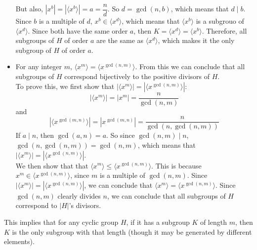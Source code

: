 \documentclass[12pt]{article}
\newcommand{\ang}[1]{\langle #1 \rangle}
\begin{document}
\begin{itemize}[label=$\diamond$]
            But also, $|x^b| = |\ang{x^b}| = a = \dfrac{n}{d}$.
            So $d = \gcd(n, b)$, which means that $d \mid b$.
            Since $b$ is a multiple of $d$, $x^b \in \ang{x^d}$,
            which means that $\ang{x^b}$ is a subgrouo of $\ang{x^d}$.
            Since both have the same order $a$,
            then $K = \ang{x^d} = \ang{x^b}$.
            Therefore, all subgroups of $H$ of order $a$
            are the same as $\ang{x^d}$,
            which makes it the only subgroup of $H$
            of order $a$.
        \item
            For any integer $m$,
            $\ang{x^m} = \ang{x^{\gcd(n, m)}}$.
            From this we can conclude that all subgroups of $H$
            correspond bijectively to the positive divisors of $H$. \\
            To prove this,
            we first show that $|\ang{x^m}| = |\ang{x^{\gcd(n, m)}}|$:
            \[ |\ang{x^m}| = |x^m| = \dfrac{n}{\gcd(n, m)} \]
            and 
            \[ |\ang{x^{\gcd(m, n)}}|
            = |x^{\gcd(m, n)}|
            = \dfrac{n}{\gcd(n, \gcd(n, m))} \]
            If $a \mid n$, then $\gcd(a, n) = a$.
            So since $\gcd(n, m) \mid n$,
            $\gcd(n, \gcd(n, m)) = \gcd(n, m)$,
            which means that $|\ang{x^m}| = |\ang{x^{\gcd(n, m)}}|$. \\
            We then show that 
            that $\ang{x^m} \leqslant \ang{x^{\gcd(n, m)}}$.
            This is because $x^m \in \ang{x^{\gcd(n, m)}}$,
            since $m$ is a multiple of $\gcd(n, m)$.
            Since $|\ang{x^m}| = |\ang{x^{\gcd(n, m)}}|$,
            we can conclude that $\ang{x^m} = \ang{x^{\gcd(n, m)}}$.
            Since $\gcd(n, m)$ clearly divides $n$,
            we can conclude that all subgroups of $H$
            correspond to $|H|$'s divisors.
    \end{itemize}

    This implies that for any cyclic group $H$,
    if it has a subgroup $K$ of length $m$,
    then $K$ is the only subgroup with that length
    (though it may be generated by different elements). \\
\end{document}
